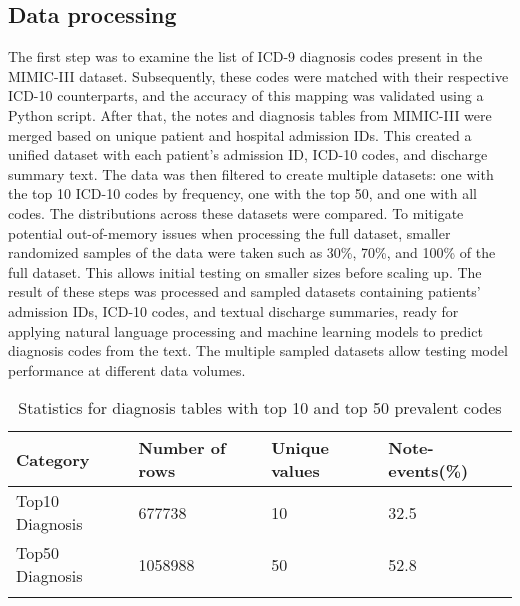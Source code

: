 \documentclass[journal,article,submit,pdftex,moreauthors]{Definitions/mdpi}
\begin{document}
\subsection{Data processing}\label{subsec3}
The first step was to examine the list of ICD-9 diagnosis codes present in the MIMIC-III dataset. Subsequently, these codes were matched with their respective ICD-10 counterparts, and the accuracy of this mapping was validated using a Python script.
After that, the notes and diagnosis tables from MIMIC-III were merged based on unique patient and hospital admission IDs. This created a unified dataset with each patient's admission ID, ICD-10 codes, and discharge summary text.
The data was then filtered to create multiple datasets: one with the top 10 ICD-10 codes by frequency, one with the top 50, and one with all codes. The distributions across these datasets were compared.
To mitigate potential out-of-memory issues when processing the full dataset, smaller randomized samples of the data were taken such as 30\%, 70\%, and 100\% of the full dataset. This allows initial testing on smaller sizes before scaling up.
The result of these steps was processed and sampled datasets containing patients' admission IDs, ICD-10 codes, and textual discharge summaries, ready for applying natural language processing and machine learning models to predict diagnosis codes from the text. 
The multiple sampled datasets allow testing model performance at different data volumes.
\begin{table}[h]
\caption{Statistics for diagnosis tables with top 10 and top 50 prevalent codes}\label{tab2}%
\begin{tabular}{@{}llll@{}}
\toprule
Category & Number of rows  & Unique values & Note-events(\%) \\
\midrule
Top10 Diagnosis    & 677738   & 10  & 32.5  \\
Top50 Diagnosis   & 1058988  & 50  & 52.8 \\

\botrule
\end{tabular}
\end{table}
\end{document}
